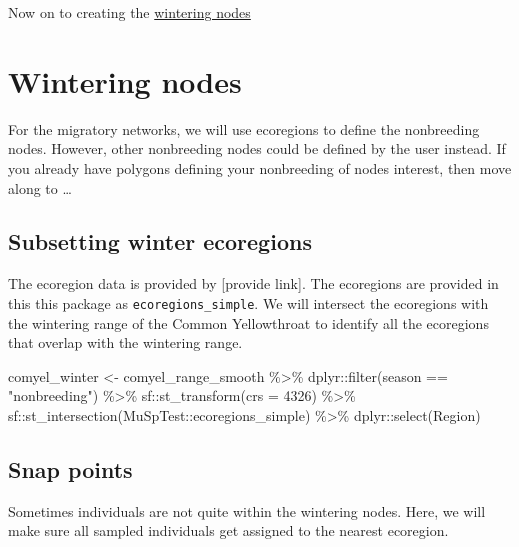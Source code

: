 \documentclass[
]{book}
\newenvironment{Shaded}{\begin{snugshade}}{\end{snugshade}}
\newcommand{\AttributeTok}[1]{\textcolor[rgb]{0.77,0.63,0.00}{#1}}
\newcommand{\DecValTok}[1]{\textcolor[rgb]{0.00,0.00,0.81}{#1}}
\newcommand{\FunctionTok}[1]{\textcolor[rgb]{0.00,0.00,0.00}{#1}}
\newcommand{\NormalTok}[1]{#1}
\newcommand{\OtherTok}[1]{\textcolor[rgb]{0.56,0.35,0.01}{#1}}
\newcommand{\SpecialCharTok}[1]{\textcolor[rgb]{0.00,0.00,0.00}{#1}}
\newcommand{\StringTok}[1]{\textcolor[rgb]{0.31,0.60,0.02}{#1}}
\begin{document}
Now on to creating the \protect\hyperlink{wintering}{wintering nodes}

\hypertarget{wintering}{%
\chapter{Wintering nodes}\label{wintering}}

For the migratory networks, we will use ecoregions to define the nonbreeding nodes. However, other nonbreeding nodes could be defined by the user instead. If you already have polygons defining your nonbreeding of nodes interest, then move along to \ldots{}

\hypertarget{subsetting-winter-ecoregions}{%
\section{Subsetting winter ecoregions}\label{subsetting-winter-ecoregions}}

The ecoregion data is provided by {[}provide link{]}. The ecoregions are provided in this this package as \texttt{ecoregions\_simple}. We will intersect the ecoregions with the wintering range of the Common Yellowthroat to identify all the ecoregions that overlap with the wintering range.

\begin{Shaded}
\begin{Highlighting}[]
\NormalTok{comyel\_winter }\OtherTok{\textless{}{-}}\NormalTok{ comyel\_range\_smooth }\SpecialCharTok{\%\textgreater{}\%}
\NormalTok{  dplyr}\SpecialCharTok{::}\FunctionTok{filter}\NormalTok{(season }\SpecialCharTok{==} \StringTok{"nonbreeding"}\NormalTok{) }\SpecialCharTok{\%\textgreater{}\%}
\NormalTok{  sf}\SpecialCharTok{::}\FunctionTok{st\_transform}\NormalTok{(}\AttributeTok{crs =} \DecValTok{4326}\NormalTok{) }\SpecialCharTok{\%\textgreater{}\%}
\NormalTok{  sf}\SpecialCharTok{::}\FunctionTok{st\_intersection}\NormalTok{(MuSpTest}\SpecialCharTok{::}\NormalTok{ecoregions\_simple) }\SpecialCharTok{\%\textgreater{}\%}
\NormalTok{  dplyr}\SpecialCharTok{::}\FunctionTok{select}\NormalTok{(Region)}
\end{Highlighting}
\end{Shaded}

\hypertarget{snap-points}{%
\section{Snap points}\label{snap-points}}

Sometimes individuals are not quite within the wintering nodes. Here, we will make sure all sampled individuals get assigned to the nearest ecoregion.
\end{document}
